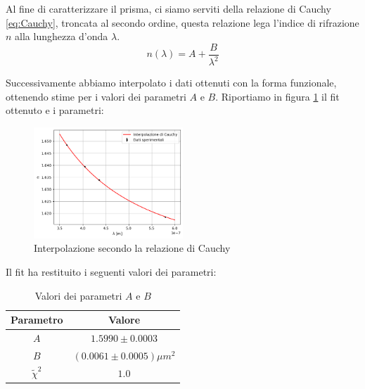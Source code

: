 \documentclass[letterpaper,12pt]{article}
\begin{document}
Al fine di caratterizzare il prisma, ci siamo serviti della relazione di Cauchy \eqref{eq:Cauchy}, troncata al secondo ordine,
questa relazione lega l'indice di rifrazione $n$ alla lunghezza d'onda $\lambda$.
\begin{equation}
    n(\lambda) = A + \frac{B}{\lambda^2}
    \label{eq:Cauchy}
\end{equation}

Successivamente abbiamo interpolato i dati ottenuti con la forma funzionale, ottenendo stime per i valori dei parametri $A$ e $B$.
Riportiamo in figura \ref{fig:Cauchy_fit} il fit ottenuto e i parametri:
\begin{figure}[h!]
    \centering
    \includegraphics[width = 0.5\textwidth]{Cauchy_fit.png}
    \caption{Interpolazione secondo la relazione di Cauchy}
    \label{fig:Cauchy_fit}
\end{figure}

Il fit ha restituito i seguenti valori dei parametri:
\begin{table}[h!]
    \centering
    \begin{tabular}{|c|c|}
    \hline
    \textbf{Parametro} & \textbf{Valore} \\
    \hline
    $A$ & $1.5990 \pm 0.0003$ \\
    \hline
    $B$ & $(0.0061 \pm 0.0005) \mu m^2$ \\
    \hline
    $\tilde{\chi}^2$ & $1.0$ \\
    \hline
    \end{tabular}
    \caption{Valori dei parametri $A$ e $B$}
    \label{tab:cauchy_fit}
\end{table}
\end{document}
